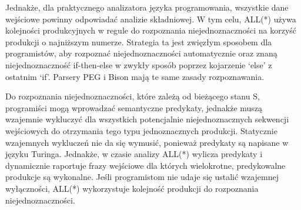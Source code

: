 Jednakże, dla praktycznego analizatora języka programowania,
wszystkie dane wejściowe powinny odpowiadać analizie składniowej.
W tym celu, ALL(*) używa kolejności produkcyjnych w regule do rozpoznania
niejednoznaczności na korzyść produkcji o najniższym numerze.
Strategia ta jest zwięzłym sposobem dla programistów, aby rozpoznać niejednoznaczności
automatycznie oraz znaną niejednoznaczność if-then-else w zwykły sposób
poprzez kojarzenie ‘else’ z ostatnim ‘if’. Parsery PEG i Bison mają te same zasady rozpoznawania.
\par
Do rozpoznania niejednoznaczności, które zależą od bieżącego stanu S, programiści mogą
wprowadzać semantyczne predykaty, jednakże muszą wzajemnie wykluczyć dla wszystkich
potencjalnie niejednoznacznych sekwencji wejściowych do otrzymania tego typu jednoznacznych produkcji.
Statycznie wzajemnych wykluczeń nie da się wymusić, ponieważ predykaty są napisane w języku Turinga.
Jednakże, w czasie analizy ALL(*) wylicza predykaty i dynamicznie raportuje
frazy wejściowe dla których wielokrotne, predykowalne produkcje są wykonalne.
Jeśli programistom nie udaje się ustalić wzajemnej wyłączności, ALL(*)
wykorzystuje kolejność produkcji do rozpoznania niejednoznaczności.

